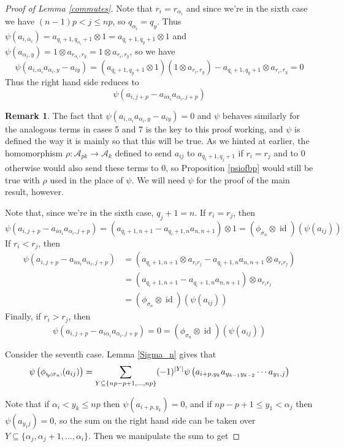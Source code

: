 \documentclass[11pt]{amsart}
\def\A{{\mathcal A}}
\def\s{{\sigma}}
\def\a{\alpha}
\newcommand*{\subsmallp}[1]{\scalebox{.5}{\ensuremath#1}}
\newcommand{\subpp}[2][p]{\imath_{\hspace*{-1pt}#1}\hspace*{-.5pt}\subsmallp(#2\subsmallp)}
\newcommand\id{\operatorname{id}}
\theoremstyle{definition}
\newtheorem{rem}[thm]{Remark}
\begin{document}
\begin{proof} [Proof of Lemma \ref{commutes}]
Note that $r_i = r_{\a_i}$ and since we're in the sixth case we have $(n-1)p<j\le np$, so $q_{\a_i}=q_y$.  Thus $\psi(a_{i,\a_i}) = a_{q_i+1,q_{\a_i}+1}\otimes 1 = a_{q_i+1,q_y+1}\otimes 1$ and $\psi(a_{\a_i,y}) = 1\otimes a_{r_{\a_i},r_y} = 1\otimes a_{r_i,r_y}$, so we have
$$\psi(a_{i,\a_i}a_{\a_i,y} - a_{iy}) = \left(a_{q_i+1,q_y+1}\otimes 1\right)\left(1\otimes a_{r_i,r_y}\right) - a_{q_i+1,q_y+1}\otimes a_{r_i,r_y} = 0$$
Thus the right hand side reduces to 
$$\psi\left(a_{i,j+p} - a_{i\a_i}a_{\a_i,j+p}\right)$$

\begin{rem}
The fact that $\psi(a_{i,\a_i}a_{\a_i,y} - a_{iy}) = 0$ and $\psi$ behaves similarly for the analogous terms in cases 5 and 7 is the key to this proof working, and $\psi$ is defined the way it is mainly so that this will be true.  As we hinted at earlier, the homomorphism $\rho\colon \A_{pk}\rightarrow \A_k$ defined to send $a_{ij}$ to $a_{q_i+1,q_j+1}$ if $r_i=r_j$ and to 0 otherwise would also send these terms to 0, so Proposition \ref{psiofbp} would still be true with $\rho$ used in the place of $\psi$.  We will need $\psi$ for the proof of the main result, however.
\end{rem}

\noindent Note that, since we're in the sixth case, $q_j + 1 = n$.  If $r_i = r_j$, then 
$$\psi\left(a_{i,j+p} - a_{i\a_i}a_{\a_i,j+p}\right) = \left(a_{q_i+1,n+1} - a_{q_i+1,n}a_{n,n+1}\right)\otimes 1 = (\phi_{\s_n} \otimes \id)(\psi(a_{ij}))$$
If $r_i < r_j$, then
\begin{align*}
\psi\left(a_{i,j+p} - a_{i\a_i}a_{\a_i,j+p}\right) &= \left(a_{q_i+1,n+1}\otimes a_{r_ir_j} - a_{q_i+1,n}a_{n,n+1}\otimes a_{r_ir_j}\right)\\
&= \left(a_{q_i+1,n+1} - a_{q_i+1,n}a_{n,n+1}\right)\otimes a_{r_ir_j}\\
&= (\phi_{\s_n} \otimes \id)(\psi(a_{ij}))
\end{align*}
Finally, if $r_i > r_j$, then
$$\psi\left(a_{i,j+p} - a_{i\a_i}a_{\a_i,j+p}\right) = 0 = (\phi_{\s_n} \otimes \id)(\psi(a_{ij}))$$



\noindent Consider the seventh case.  Lemma \ref{Sigma_n} gives that
$$\psi\left(\phi_{\subpp{\s_n}}(a_{ij})\right) = \sum_{Y\subseteq \{np-p+1,\ldots,np\}}(-1)^{|Y|}\psi\left(a_{i + p,y_k}a_{y_{k-1}y_{k-2}}\cdots a_{y_1,j}\right)$$


Note that if $\a_i < y_k \le np$ then $\psi(a_{i+p,y_k}) = 0$, and if $np - p + 1 \le y_1 < \a_j$ then $\psi(a_{y_1j}) = 0$, so the sum on the right hand side can be taken over $Y\subseteq\{\a_j,\a_j+1,\ldots,\a_i\}$.  Then we manipulate the sum to get


\end{proof}
\end{document}
